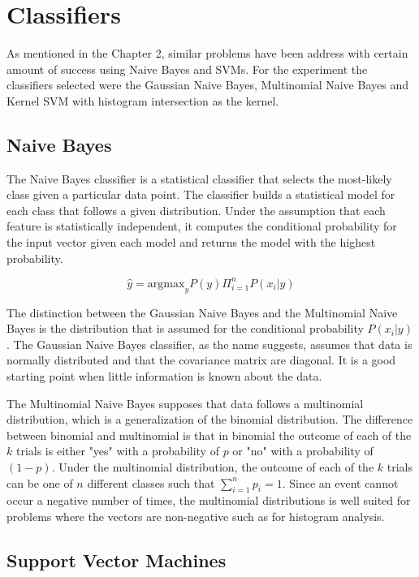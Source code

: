 \section*{Classifiers}

As mentioned in the Chapter 2, similar problems have been address with
certain amount of success using Naive Bayes and SVMs. For the experiment the 
classifiers selected were the Gaussian Naive Bayes, Multinomial Naive Bayes and 
Kernel SVM with histogram intersection as the kernel. 

\subsection*{Naive Bayes}

The Naive Bayes classifier is a statistical classifier that selects the most-likely 
class given a particular data point. The classifier builds a statistical model for each class that 
follows a given distribution. Under the assumption that each
feature is statistically independent, it computes the conditional probability for 
the input vector given each model and returns the model with the highest probability.

\[ \hat{y} = \text{argmax}_{y} P(y) \Pi_{i=1}^{n} P(x_i|y)\]

The distinction between the Gaussian Naive Bayes and the Multinomial Naive Bayes is the 
distribution that is assumed for the conditional probability $P(x_i | y)$.  The Gaussian Naive
Bayes classifier, as the name suggests, assumes that data is normally distributed and 
that the covariance matrix are diagonal. It is a good 
starting point when little information is known about the data. 

The Multinomial Naive Bayes supposes that data follows a multinomial distribution, which is a generalization 
of the binomial distribution.  The difference between binomial and multinomial is that in binomial the outcome 
of each of the $k$ trials is either "yes" with a probability of $p$ or "no" with a probability of $(1-p)$. Under the multinomial
distribution, the outcome of each of the $k$ trials can be one of $n$ different classes such that $\sum^n_{i=1}p_i = 1$.
Since an event cannot occur a negative number of times, the multinomial distributions is well suited for problems where 
the vectors are non-negative such as for histogram analysis. 

\subsection*{Support Vector Machines}

